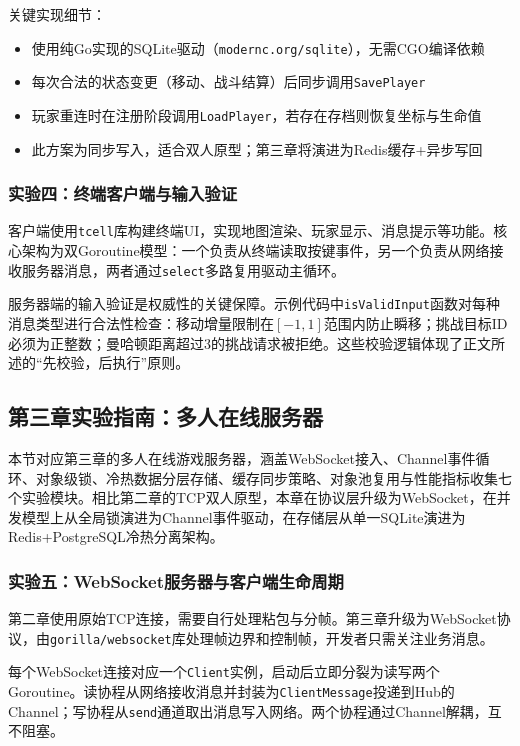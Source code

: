 关键实现细节：
\begin{itemize}
\item 使用纯Go实现的SQLite驱动（\texttt{modernc.org/sqlite}），无需CGO编译依赖
\item 每次合法的状态变更（移动、战斗结算）后同步调用\texttt{SavePlayer}
\item 玩家重连时在注册阶段调用\texttt{LoadPlayer}，若存在存档则恢复坐标与生命值
\item 此方案为同步写入，适合双人原型；第三章将演进为Redis缓存+异步写回
\end{itemize}

\subsubsection{实验四：终端客户端与输入验证}

客户端使用\texttt{tcell}库构建终端UI，实现地图渲染、玩家显示、消息提示等功能。核心架构为双Goroutine模型：一个负责从终端读取按键事件，另一个负责从网络接收服务器消息，两者通过\texttt{select}多路复用驱动主循环。

服务器端的输入验证是权威性的关键保障。示例代码中\texttt{isValidInput}函数对每种消息类型进行合法性检查：移动增量限制在$[-1, 1]$范围内防止瞬移；挑战目标ID必须为正整数；曼哈顿距离超过3的挑战请求被拒绝。这些校验逻辑体现了正文所述的``先校验，后执行''原则。

\subsection{第三章实验指南：多人在线服务器}

本节对应第三章的多人在线游戏服务器，涵盖WebSocket接入、Channel事件循环、对象级锁、冷热数据分层存储、缓存同步策略、对象池复用与性能指标收集七个实验模块。相比第二章的TCP双人原型，本章在协议层升级为WebSocket，在并发模型上从全局锁演进为Channel事件驱动，在存储层从单一SQLite演进为Redis+PostgreSQL冷热分离架构。

\subsubsection{实验五：WebSocket服务器与客户端生命周期}

第二章使用原始TCP连接，需要自行处理粘包与分帧。第三章升级为WebSocket协议，由\texttt{gorilla/websocket}库处理帧边界和控制帧，开发者只需关注业务消息。

每个WebSocket连接对应一个\texttt{Client}实例，启动后立即分裂为读写两个Goroutine。读协程从网络接收消息并封装为\texttt{ClientMessage}投递到Hub的Channel；写协程从\texttt{send}通道取出消息写入网络。两个协程通过Channel解耦，互不阻塞。

